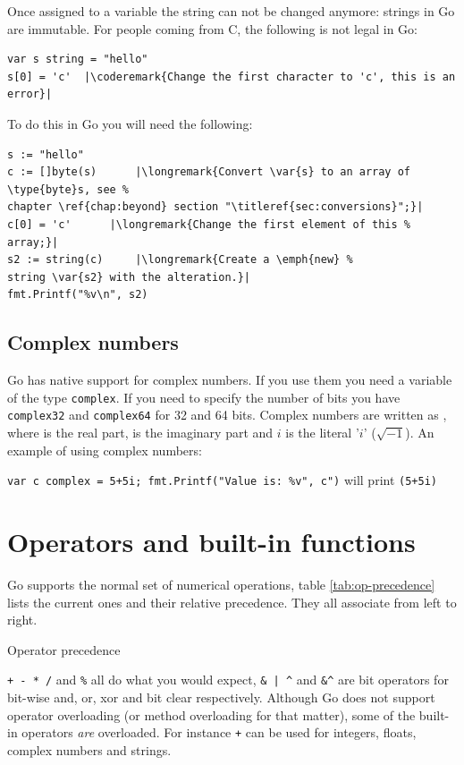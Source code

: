Once assigned to a variable the string can not be changed anymore: strings in Go are
immutable. For
people coming from C, the following is not legal in Go:
\begin{lstlisting}
var s string = "hello"
s[0] = 'c'  |\coderemark{Change the first character to 'c', this is an error}|
\end{lstlisting}
To do this in Go you will need the following:
\begin{lstlisting}
s := "hello"
c := []byte(s)	    |\longremark{Convert \var{s} to an array of \type{byte}s, see %
chapter \ref{chap:beyond} section "\titleref{sec:conversions}";}|
c[0] = 'c'	    |\longremark{Change the first element of this %
array;}|
s2 := string(c)     |\longremark{Create a \emph{new} %
string \var{s2} with the alteration.}|
fmt.Printf("%v\n", s2)
\end{lstlisting}

\showremarks
\subsection{Complex numbers}
Go has native support for complex numbers. If you 
use them you need a variable of the type \lstinline{complex}. If
you need to specify the number of bits you have \lstinline{complex32} and
\lstinline{complex64} for 32 and 64 bits. Complex numbers are written as
, where  is the real part,
 is the imaginary part and $i$ is the literal '$i$' ($\sqrt{-1}$).
An example of using complex numbers:

\lstinline{var c complex = 5+5i; fmt.Printf("Value is: %v", c")}\newline
will print\newline
\indent\lstinline{(5+5i)}

\section{Operators and built-in functions}
Go supports the normal set of numerical operations,
table \ref{tab:op-precedence}
lists the current ones and their relative precedence. They
all associate from left to right.

\begin{table}[H]
\begin{center}
\caption{Operator precedence}
\label{tab:op-precedence}

\end{center}
\end{table}
\verb|+ - * /| and \verb|%| all do what you would expect,
\verb!& | ^!
and \verb!&^! are bit operators for bit-wise and, or, xor and bit clear 
respectively.
Although Go does not support operator overloading (or method
overloading for that matter), some of the built-in
operators \emph{are} overloaded. For instance \texttt{+} can be used for integers,
floats, complex numbers and strings.\hfill

